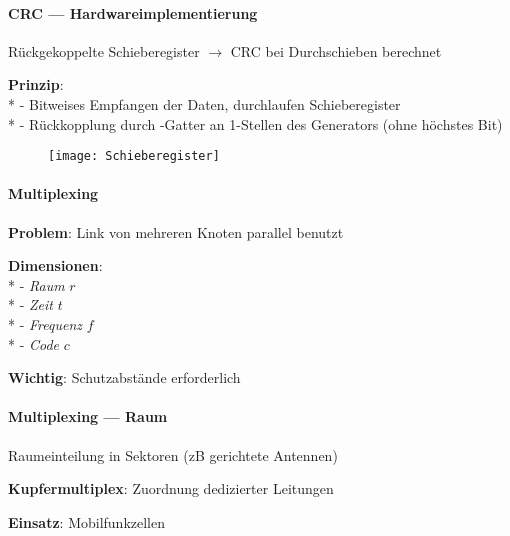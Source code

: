 \paragraph{CRC --- Hardwareimplementierung}
\begin{items}
  \item Rückgekoppelte Schieberegister \( \to \) CRC bei Durchschieben berechnet
  \item \textbf{Prinzip}: \\*
    - Bitweises Empfangen der Daten, durchlaufen Schieberegister \\*
    - Rückkopplung durch -Gatter an 1-Stellen des Generators (ohne höchstes Bit)
\end{items}
\begin{figure}[H]\centering\label{Schieberegister}\texttt{[image: Schieberegister]}\end{figure}

\paragraph{Multiplexing}
\begin{items}
  \item \textbf{Problem}: Link von mehreren Knoten parallel benutzt
  \item \textbf{Dimensionen}: \\*
    - \emph{Raum} \( r \) \\*
    - \emph{Zeit} \( t \) \\*
    - \emph{Frequenz} \( f \) \\*
    - \emph{Code} \( c \)
  \item \textbf{Wichtig}: Schutzabstände erforderlich
\end{items}

\paragraph{Multiplexing --- Raum}
\begin{items}
  \item Raumeinteilung in Sektoren (zB gerichtete Antennen)
  \item \textbf{Kupfermultiplex}: Zuordnung dedizierter Leitungen
  \item \textbf{Einsatz}: Mobilfunkzellen
\end{items}

